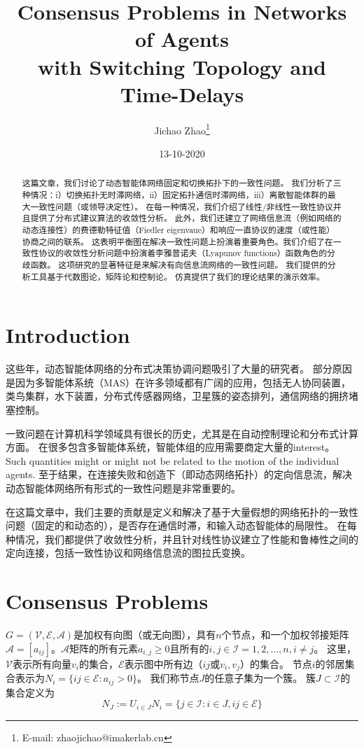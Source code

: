 \documentclass{article}
\title{Consensus Problems in Networks of Agents\\ with Switching Topology and Time-Delays}
\author{ Jichao Zhao\thanks{E-mail: zhaojichao@imakerlab.cn}}
\date{13-10-2020}
\begin{document}
\maketitle
\tableofcontents


\begin{abstract}
这篇文章，我们讨论了动态智能体网络固定和切换拓扑下的一致性问题。
我们分析了三种情况：i）切换拓扑无时滞网络，ii）固定拓扑通信时滞网络，iii）离散智能体群的最大一致性问题（或领导决定性）。
在每一种情况，我们介绍了线性/非线性一致性协议并且提供了分布式建议算法的收敛性分析。
此外，我们还建立了网络信息流（例如网络的动态连接性）的费德勒特征值（Fiedler eigenvaue）和响应一直协议的速度（或性能）协商之间的联系。
这表明平衡图在解决一致性问题上扮演着重要角色。我们介绍了在一致性协议的收敛性分析问题中扮演着李雅普诺夫（Lyapunov functions）函数角色的分歧函数。
这项研究的显著特征是来解决有向信息流网络的一致性问题。
我们提供的分析工具基于代数图论，矩阵论和控制论。
仿真提供了我们的理论结果的演示效率。
\end{abstract}

\section{Introduction}
这些年，动态智能体网络的分布式决策协调问题吸引了大量的研究者。
部分原因是因为多智能体系统（MAS）在许多领域都有广阔的应用，包括无人协同装置，类鸟集群，水下装置，分布式传感器网络，卫星簇的姿态排列，通信网络的拥挤堵塞控制。


一致问题在计算机科学领域具有很长的历史，尤其是在自动控制理论和分布式计算方面。
在很多包含多智能体系统，智能体组的应用需要商定大量的interest。
Such quantities might or might not be related to the motion of the individual agents. 
至于结果，在连接失败和创造下（即动态网络拓扑）的定向信息流，解决动态智能体网络所有形式的一致性问题是非常重要的。


在这篇文章中，我们主要的贡献是定义和解决了基于大量假想的网络拓扑的一致性问题（固定的和动态的），是否存在通信时滞，和输入动态智能体的局限性。
在每种情况，我们都提供了收敛性分析，并且针对线性协议建立了性能和鲁棒性之间的定向连接，包括一致性协议和网络信息流的图拉氏变换。

\section{Consensus Problems}
$G=(\mathcal{V},\mathcal{E},\mathcal{A})$是加权有向图（或无向图），具有$n$个节点，和一个加权邻接矩阵$\mathcal{A}=[a_{ij}]$。$\mathcal{A}$矩阵的所有元素$a_{i,j} \ge 0$且所有的$i,j \in \mathcal{I}={1,2,…,n},i \ne j$。
这里，$\mathcal{V}$表示所有向量$v_i$的集合，$\mathcal{E}$表示图中所有边（$ij$或$v_i,v_j$）的集合。
节点$i$的邻居集合表示为$N_i=\{ij\in \mathcal{E}:a_{ij}>0\}$。
我们称节点$J$的任意子集为一个簇。
簇$J\subset \mathcal{I}$的集合定义为
\begin{equation}
    N_J:=U_{i\in J}N_i=\{j\in \mathcal{I}:i\in J, ij\in \mathcal{E}\}
    \tag{1}
    \label{1}
\end{equation}
\end{document}
